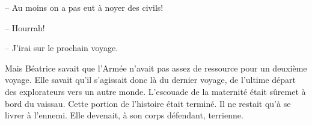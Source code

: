 

-- Au moins on a pas eut à noyer des civils!

-- Hourrah!

\sautSection{}


-- J'irai sur le prochain voyage. 

Mais Béatrice savait que l'Armée n'avait pas assez de ressource pour un
deuxième voyage.  
%
Elle savait qu'il s'agissait donc là du dernier voyage, de l'ultime départ des
explorateurs vers un autre monde.
%
L'escouade de la maternité était sûremet à bord du vaissau.  Cette portion de
l'histoire était terminé. Il ne restait qu'à se livrer à l'ennemi.  Elle
devenait, à son corps défendant, terrienne.
